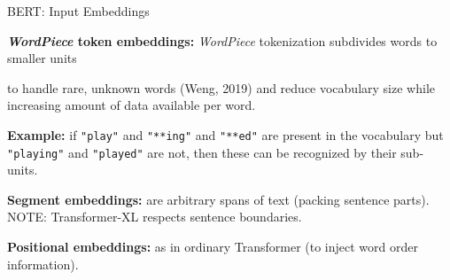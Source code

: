 \begin{frame}{BERT: Input Embeddings}
    
    \begin{itemizeSpaced}{10pt}
        \footnotesize 
        
        \pinkbox  \textbf{\textit{WordPiece} token embeddings: } \emph{WordPiece} tokenization subdivides words to smaller units 
        
        \vspace{7pt}
        \begin{itemizeSpaced}{7pt}
        
            \footnotesize
            \item to handle rare, unknown words (Weng, 2019) and reduce vocabulary size while increasing amount of data available per word.
            
            \pinkbox \textbf{Example: }if \texttt{"play"} and \texttt{"**ing"} and \texttt{"**ed"} are present in the vocabulary but \texttt{"playing"} and \texttt{"played"} are not, then these can be recognized by their sub-units. 
        \end{itemizeSpaced}
        
        
        \pinkbox \textbf{Segment embeddings: } are arbitrary spans of text (packing sentence parts). 
        NOTE: Transformer-XL respects sentence boundaries. 
        
        \item \textbf{Positional embeddings: } as in ordinary Transformer (to inject word order information). 
    
    \end{itemizeSpaced}
    
\end{frame}




